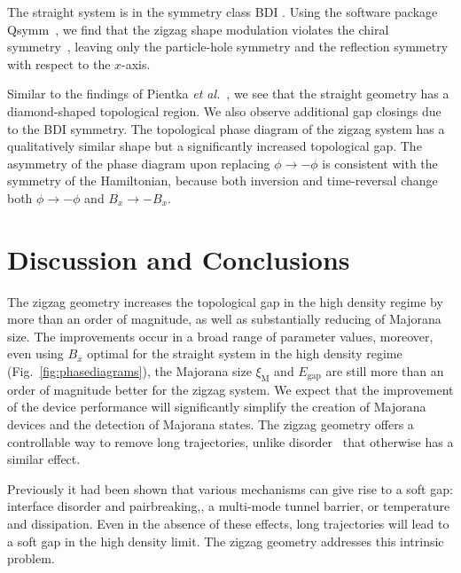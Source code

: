 \documentclass[english, twocolumn, 10pt, aps, superscriptaddress, floatfix, prb, citeautoscript]{revtex4-1}
\renewcommand{\comment}[2]{#2}
\begin{document}
\comment{The introduction of a the zigzag breaks a chiral symmetry, bringing the system from the BDI to the D symmetry class}
The straight system is in the symmetry class BDI \cite{Pientka2017}.
Using the software package Qsymm~\cite{Varjas2018}, we find that the zigzag shape modulation violates the chiral symmetry~\cite{Setiawan2019}, leaving only the particle-hole symmetry and the reflection symmetry with respect to the $x$-axis.

\comment{The phase diagram does not change much, except we see a cleaner spectrum as a result of the D class symmetry.}
Similar to the findings of Pientka \textit{et al.}~\cite{Pientka2017}, we see that the straight geometry has a diamond-shaped topological region.
We also observe additional gap closings due to the BDI symmetry.
The topological phase diagram of the zigzag system has a qualitatively similar shape but a significantly increased topological gap.
The asymmetry of the phase diagram upon replacing $\phi \rightarrow -\phi$ is consistent with the symmetry of the Hamiltonian, because both inversion and time-reversal change both $\phi \rightarrow -\phi$ and $B_x \rightarrow -B_x$.

\section{Discussion and Conclusions}

\comment{The zigzag geometry is a controllable tool in hardening the gap and decreasing Majorana size.}
The zigzag geometry increases the topological gap in the high density regime by more than an order of magnitude, as well as substantially reducing of Majorana size.
The improvements occur in a broad range of parameter values, moreover, even using $B_x$ optimal for the straight system in the high density regime (Fig.~\ref{fig:phasediagrams}), the Majorana size $\xi_\textrm{M}$ and $E_\textrm{gap}$ are still more than an order of magnitude better for the zigzag system.
We expect that the improvement of the device performance will significantly simplify the creation of Majorana devices and the detection of Majorana states.
The zigzag geometry offers a controllable way to remove long trajectories, unlike disorder~\cite{Haim2018} that otherwise has a similar effect.

Previously it had been shown that various mechanisms can give rise to a soft gap: interface disorder and pairbreaking,\cite{Takei2013}, a multi-mode tunnel barrier,\cite{Stanescu2014} or temperature and dissipation.\cite{Liu2017} Even in the absence of these effects, long trajectories will lead to a soft gap in the high density limit. The zigzag geometry addresses this intrinsic problem.
\end{document}
